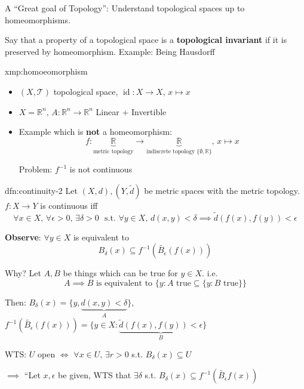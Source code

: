 \documentclass{article}
\DeclareMathOperator{\id}{id}
\begin{document}
A ``Great goal of Topology'': Understand topological spaces up to homeomorphisms.

Say that a property of a topological space is a \textbf{topological invariant} if it is preserved by homeomorphism. Example: Being Hausdorff

\begin{xmp}{xmp:homoeomorphism}{}
    \begin{itemize}
        \item $(X, \mathcal{T})$ topological space, $\id : X \to X,\,x \mapsto x$
        \item $X = \mathbb{R}^{n},\, A : \mathbb{R}^{n} \to \mathbb{R}^{n}$ Linear + Invertible
        \item Example which is \textbf{not} a homeomorphism:
            \[f : \underbrace{\mathbb{R}}_{\text{metric topology}} \to \underbrace{\mathbb{R}}_{\text{indiscrete topology $\{\emptyset, \mathbb{R}\}$}},\,x \mapsto x\]

            Problem: $f^{-1}$ is not continuous
    \end{itemize}
\end{xmp}

\newpage

\begin{dfn}{dfn:continuity-2}{}
    Let $(X, d), (Y, \tilde{d})$ be metric spaces with the metric topology. $f : X \to Y$ is continuous iff
    \[\forall x\in X,\,\forall \epsilon > 0,\,\exists \delta > 0\,\, \text{ s.t. } \forall y\in X,\,d(x, y) < \delta \implies \tilde{d}(f(x),f(y)) < \epsilon\]
\end{dfn}

\textbf{Observe}: $\forall y\in X$ is equivalent to
\[B_{\delta}(x) \subseteq f^{-1}(\tilde{B_{\epsilon}}(f(x)))\]

Why? Let $A, B$ be things which can be true for $y\in X$. i.e.
\[A \implies B \text{ is equivalent to } \{y : A \text{ true} \subseteq \{y : B \text{ true}\}\}\]

Then: $B_{\delta}(x) = \{y, \underbrace{d(x,y) < \delta}_{A}\}$, $f^{-1}(\tilde{B_{\epsilon}}(f(x))) = \{y \in X : \underbrace{\tilde{d}(f(x), f(y)) < \epsilon}_{B}\}$

WTS: $U$ open $\iff$ $\forall x\in U,\,\exists r > 0$ s.t. $B_{\delta}(x) \subseteq U$

$\implies$ ``Let $x, \epsilon$ be given, WTS that $\exists \delta$ s.t. $B_{\delta}(x) \subseteq f^{-1}(\tilde{B_{\epsilon}}f(x))$
\end{document}
